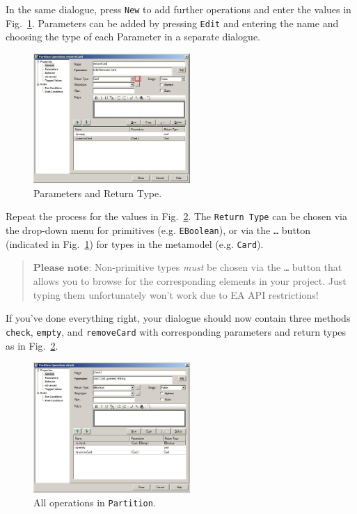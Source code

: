 \clearpage

In the same dialogue, press \texttt{New} to add further operations and enter the
values in Fig.~\ref{fig:operation_parameters}.  Parameters can be added by
pressing \texttt{Edit} and entering the name and choosing the type of each
Parameter in a separate dialogue.

\begin{figure}[htbp]
	\centering
  \includegraphics[width=0.53\textwidth]{pics/memBoxBilder/memBox38.png}
	\caption{Parameters and Return Type.}
	\label{fig:operation_parameters} 
\end{figure}

Repeat the process for the values in Fig.~\ref{fig:operation_partition}.  The
\texttt{Return Type} can be chosen via the drop-down menu for primitives
(e.g. \texttt{EBoolean}), or via the \texttt{\ldots} button (indicated in
Fig.~\ref{fig:operation_parameters}) for types in the metamodel
(e.g. \texttt{Card}).

\vspace{-.5cm}
\begin{quote}
$\textbf{Please note:}$ Non-primitive types \emph{must} be chosen via the
\texttt{\ldots} button that allows you to browse for the corresponding elements in your
project.  Just typing them unfortunately won't work due to EA API restrictions!
\end{quote}
\vspace{-.5cm}

If you've done everything right, your dialogue should
now contain three methods \texttt{check}, \texttt{empty}, and
\texttt{removeCard} with corresponding parameters and return types as in
Fig.~\ref{fig:operation_partition}.
\begin{figure}[htbp]
	\centering
  \includegraphics[width=0.53\textwidth]{pics/memBoxBilder/memBox39}
	\caption{All operations in \texttt{Partition}.}
	\label{fig:operation_partition}
\end{figure}
\clearpage

